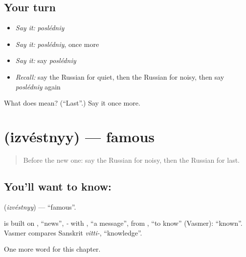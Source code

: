 \subsection*{Your turn}
\begin{itemize}
\raggedright
  \item \emph{Say it:} \emph{poslédniy}
  \item \emph{Say it:} \emph{poslédniy}, once more
  \item \emph{Say it:} say \emph{poslédniy}
  \item \emph{Recall:} say the Russian for quiet, then the Russian for noisy, then say \emph{poslédniy} again
\end{itemize}

\begin{tcolorbox}[breakable,colback=teal!4,colframe=teal!35!black,title={Before you move on}]
What does  mean? (\textquotedblleft{}Last\textquotedblright{}.) Say it once more.
\end{tcolorbox}
\section[\texorpdfstring{\ru{известный} (izvéstnyy)}{известный (izvéstnyy)}]{ (izvéstnyy) — famous}

\label{lesson:RU-C126-famous}



\begin{quote}
Before the new one: say the Russian for noisy, then the Russian for last.
\end{quote}

\subsection*{You'll want to know: }
\textbf{} (\emph{izvéstnyy}) — \textquotedblleft{}famous\textquotedblright{}.

\begin{cousinweb}
\textbf{} is built on \emph{}, \textquotedblleft{}news\textquotedblright{}, \emph{-} with \emph{}, \textquotedblleft{}a message\textquotedblright{}, from \emph{}, \textquotedblleft{}to know\textquotedblright{} (Vasmer): \textquotedblleft{}known\textquotedblright{}. Vasmer compares Sanskrit \emph{vitti-}, \textquotedblleft{}knowledge\textquotedblright{}.
\end{cousinweb}

\begin{grammarlens}[title={What you've built}]
One more word for this chapter.
\end{grammarlens}

